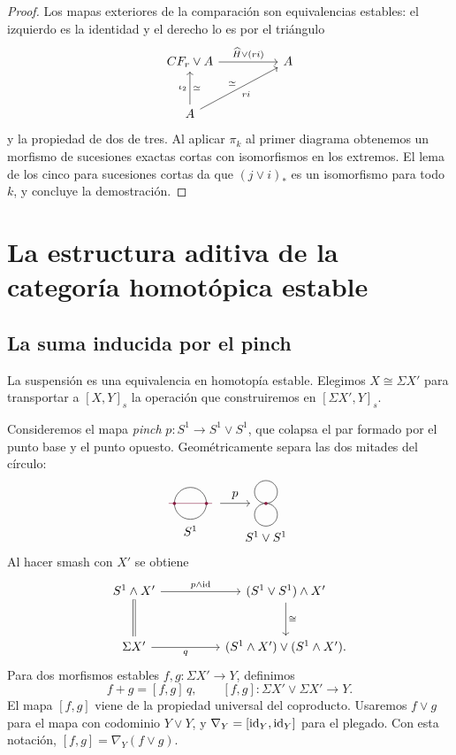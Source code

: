 \begin{proof}
Los mapas exteriores de la comparación son equivalencias estables: el izquierdo es la identidad y el derecho lo es por el triángulo
\[
\begin{tikzcd}[column sep=huge,row sep=large]
CF_r\vee A\arrow[r,"\widehat H\vee(ri)"]&A\\
A\arrow[u,"\iota_2","\simeq"']\arrow[ur,"ri"',"\simeq"]&
\end{tikzcd}
\]
y la propiedad de dos de tres. Al aplicar $\pi_k$ al primer diagrama obtenemos un morfismo de sucesiones exactas cortas con isomorfismos en los extremos. El lema de los cinco para sucesiones cortas da que $(j\vee i)_*$ es un isomorfismo para todo $k$, y concluye la demostración.
\end{proof}

\section{La estructura aditiva de la categoría homotópica estable}

\subsection{La suma inducida por el pinch}

La suspensión es una equivalencia en homotopía estable. Elegimos $X\cong\Sigma X'$ para transportar a $[X,Y]_s$ la operación que construiremos en $[\Sigma X',Y]_s$.

Consideremos el mapa \emph{pinch} $p\colon S^1\to S^1\vee S^1$, que colapsa el par formado por el punto base y el punto opuesto. Geométricamente separa las dos mitades del círculo:
\[
\begin{tikzpicture}[baseline=(current bounding box.center),scale=.65]
\draw (0,0) circle (.7);
\draw[rojoDiagramaCIMAT] (-.95,0)--(.95,0);
\fill[rojoDiagramaCIMAT] (-.7,0) circle (2pt);
\fill[rojoDiagramaCIMAT] (.7,0) circle (2pt);
\draw[->] (1.3,0)--(2.6,0) node[midway,above] {$p$};
\draw (3.3,.5) circle (.5);
\draw (3.3,-.5) circle (.5);
\fill[rojoDiagramaCIMAT] (3.3,0) circle (2pt);
\node at (0,-1.2) {$S^1$};
\node at (3.3,-1.45) {$S^1\vee S^1$};
\end{tikzpicture}
\]
Al hacer smash con $X'$ se obtiene
\[
\begin{tikzcd}[column sep=huge,row sep=large]
S^1\wedge X'\arrow[r,"p\wedge\id"]\arrow[d,equal]
&(S^1\vee S^1)\wedge X'\arrow[d,"\cong"]\\
\Sigma X'\arrow[r,"q"']&(S^1\wedge X')\vee(S^1\wedge X').
\end{tikzcd}
\]
Para dos morfismos estables $f,g\colon\Sigma X'\to Y$, definimos
\[
f+g=[f,g]\,q,
\qquad [f,g]\colon\Sigma X'\vee\Sigma X'\to Y.
\]
El mapa $[f,g]$ viene de la propiedad universal del coproducto. Usaremos $f\vee g$ para el mapa con codominio $Y\vee Y$, y $\nabla_Y=[\operatorname{id}_Y,\operatorname{id}_Y]$ para el plegado. Con esta notación, $[f,g]=\nabla_Y(f\vee g)$.


